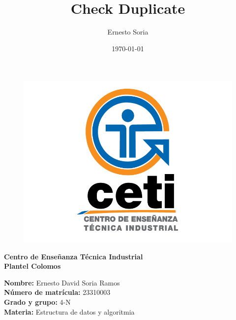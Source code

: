 \documentclass{article}
\title{\Huge \bfseries Check Duplicate}
\author{Ernesto Soria}
\date{\today} %
\begin{document}
	
	\maketitle %
	
	
	
	
	\begin{figure}[h] %
		\centering
		\includegraphics[width=1\textwidth]{cetilogo.png} %
		\label{fig:ceti} %
	\end{figure}
	
	\begin{center}
		{\LARGE \textbf{Centro de Enseñanza Técnica Industrial}} \\[2.5mm]
		{\LARGE \textbf{Plantel Colomos}}\\
	\end{center}
	
	\vspace{5mm} %
	
	\begin{flushleft}
		{\large \textbf{Nombre:} Ernesto David Soria Ramos} \\[2mm]
		{\large \textbf{Número de matrícula:} 23310003} \\[2mm]
		{\large \textbf{Grado y grupo:} 4-N}\\[2mm]
		{\large \textbf{Materia:} Estructura de datos y algoritmia }\\[2mm]
	\end{flushleft}
	
\end{document}
